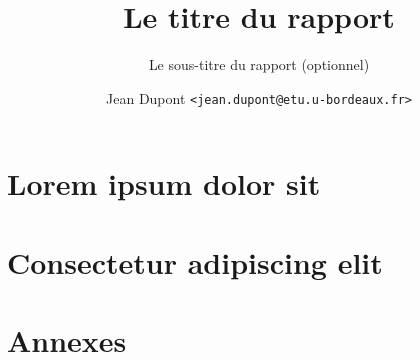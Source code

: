 \documentclass[a4paper]{memoir}
\title{Le titre du rapport}
\subtitle{Le sous-titre du rapport (optionnel)}
\author{Jean Dupont \texttt{<jean.dupont@etu.u-bordeaux.fr>}}
\begin{document}
\frontmatter%
\maketitle
\thispagestyle{empty}





\cleardoublepage
\tableofcontents*



\mainmatter%
\part{Lorem ipsum dolor sit}




\part{Consectetur adipiscing elit}








\part*{Annexes}
\appendix





\backmatter%

\nocite{*}



\printindex
\end{document}
